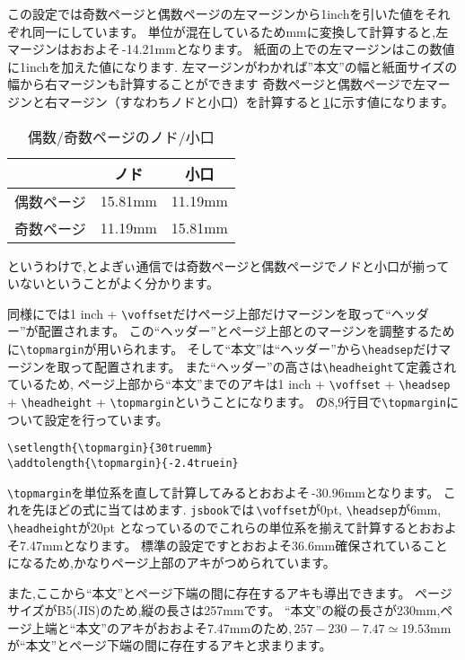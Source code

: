この設定では奇数ページと偶数ページの左マージンから1inchを引いた値をそれぞれ同一にしています。
単位が混在しているためmmに変換して計算すると,左マージンはおおよそ\,-14.21mmとなります。
紙面の上での左マージンはこの数値に1inchを加えた値になります.
左マージンがわかれば”本文”の幅と紙面サイズの幅から右マージンも計算することができます
奇数ページと偶数ページで左マージンと右マージン（すなわちノドと小口）を計算すると\tablename\,\ref{tbl:oddevenmargins}に示す値になります。
\begin{table}[!ht]
	\centering
	\caption{偶数/奇数ページのノド/小口}
	\label{tbl:oddevenmargins}
	\begin{tabular}{c|cc} \hline \hline
		& ノド & 小口 \\ \hline
		偶数ページ & 15.81mm & 11.19mm \\
		奇数ページ & 11.19mm & 15.81mm \\ \hline
	\end{tabular}
\end{table} 
というわけで,とよぎぃ通信では奇数ページと偶数ページでノドと小口が揃っていないということがよく分かります。

同様に{\pLaTeX}では1 inch + \verb|\voffset|だけページ上部だけマージンを取って``ヘッダー''が配置されます。
この``ヘッダー''とページ上部とのマージンを調整するために\verb|\topmargin|が用いられます。
そして``本文''は``ヘッダー''から\verb|\headsep|だけマージンを取って配置されます。
また``ヘッダー''の高さは\verb|\headheight|て定義されているため,
ページ上部から``本文''までのアキは1 inch + \verb|\voffset| + \verb|\headsep| + \verb|\headheight| + \verb|\topmargin|ということになります。
の8,9行目で\verb|\topmargin|について設定を行っています。
\begin{verbatim}
\setlength{\topmargin}{30truemm}
\addtolength{\topmargin}{-2.4truein}
\end{verbatim}
\verb|\topmargin|を単位系を直して計算してみるとおおよそ\,-30.96mmとなります。
これを先ほどの式に当てはめます. 
\verb|jsbook|では\,\verb|\voffset|が0pt, \verb|\headsep|が6mm, \verb|\headheight|が20pt
となっているのでこれらの単位系を揃えて計算するとおおよそ7.47mmとなります。
標準の設定ですとおおよそ36.6mm確保されていることになるため,かなりページ上部のアキがつめられています。

また,ここから``本文''とページ下端の間に存在するアキも導出できます。
ページサイズがB5(JIS)のため,縦の長さは257mmです。
``本文''の縦の長さが230mm,ページ上端と``本文''のアキがおおよそ7.47mmのため,\,$257 - 230 - 7.47 \simeq 19.53\mathrm{mm}$が``本文''とページ下端の間に存在するアキと求まります。

